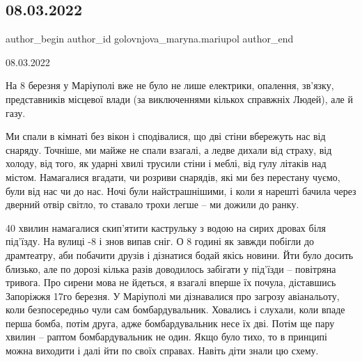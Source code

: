  
 
 
 
 

\subsection{08.03.2022}
\label{sec:04_04_2022.fb.golovnjova_maryna.mariupol.1.08_03_2022}

\ifcmt
 author_begin
   author_id golovnjova_maryna.mariupol
 author_end
\fi

08.03.2022

На 8 березня у Маріуполі вже не було не лише електрики, опалення, зв’язку,
представників місцевої влади (за виключеннями кількох справжніх Людей), але й
газу.

Ми спали в кімнаті без вікон і сподівалися, що дві стіни вбережуть нас від
снаряду. Точніше, ми майже не спали взагалі, а ледве дихали від страху, від
холоду, від того, як ударні хвилі трусили стіни і меблі, від гулу літаків над
містом. Намагалися  вгадати, чи розриви снарядів, які ми без перестану чуємо,
були від нас чи до нас. Ночі були найстрашнішими, і коли я нарешті бачила через
дверний отвір світло, то ставало трохи легше – ми дожили до ранку.


40 хвилин намагалися скип’ятити каструльку з водою на сирих дровах біля
під’їзду. На вулиці -8 і знов випав сніг. О 8 годині як завжди побігли до
драмтеатру, аби побачити друзів і дізнатися бодай якісь новини. Йти було досить
близько, але по дорозі кілька разів доводилось забігати у під’їзди – повітряна
тривога. Про сирени мова не йдеться, я взагалі вперше їх почула, діставшись
Запоріжжя 17го березня. У Маріуполі ми дізнавалися про загрозу авіанальоту,
коли безпосередньо чули сам бомбардувальник. Ховались і слухали, коли впаде
перша бомба, потім друга, адже бомбардувальник несе їх дві. Потім ще пару
хвилин – раптом бомбардувальник не один. Якщо було тихо, то в принципі можна
виходити і далі йти по своїх справах. Навіть діти знали цю схему.

